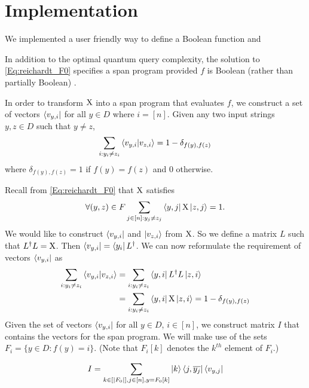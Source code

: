 \section{Implementation}

We implemented a user friendly way to define a Boolean function and 


In addition to the optimal quantum query complexity,
the solution to \cref{Eq:reichardt_F0} specifies
a span program provided $f$ is Boolean (rather than
partially Boolean) \cite{reichardt2009span}.

In order to transform $\operatorname{X}$ into a span program that
evaluates $f$, we construct a set of vectors
$\bra{v_{y,i}}$ for all $y \in D$ where $i = [n]$.
Given any two input strings $y, z \in D$ such that $y\neq z$,
\begin{align}
    \sum_{i: y_i \ne z_i} \braket{v_{y,i}|v_{z,i}} = 1 - \delta_{f(y), f(z)}
    \nonumber
\end{align}
where $\delta_{f(y), f(z)} = 1$ if $f(y) = f(z)$ and $0$ otherwise.

Recall from \cref{Eq:reichardt_F0} that $\operatorname{X}$ satisfies
\begin{align}
    \forall (y,z) \in F \sum_{j \in [n]: y_j \ne z_j} 
    \bra{y,j} \operatorname{X} \ket{z, j} = 1 \nonumber.
\end{align}
We would like to construct $\bra{v_{y,i}}$ and $\ket{v_{z,i}}$
from $\operatorname{X}$.
So we define a matrix $L$ such that $L^\dagger L = \operatorname{X}$.
Then $\bra{v_{y,i}} = \bra{y_i}L^\dagger$.
We can now reformulate the requirement of vectors $\bra{v_{y,i}}$
as
\begin{align}
    \sum_{i: y_i \ne z_i} \braket{v_{y,i}|v_{z,i}} &= \sum_{i: y_i \ne z_i}
    \bra{y,i} L^\dagger L \ket{z, i} \nonumber \\
    &= \sum_{i: y_i \ne z_i} \bra{y,i} \operatorname{X} \ket{z, i} = 
    1 - \delta_{f(y), f(z)}
    \nonumber
\end{align}
Given the set of vectors $\bra{v_{y,i}}$ for all $y \in
D$, $i \in [n]$, we construct 
matrix $I$ that contains the vectors for the span
program. We will make use of the sets $F_i =
\{y \in D: f(y) = i\}$.
(Note that $F_i[k]$ denotes the $k^{th}$ element of $F_i$.)

\begin{align}\label{input_vectors}
    I = \sum_{k \in [|F_0|], j \in [n], y = F_0[k]}
    \ket{k}\bra{j, \overline{y_j}} \bra{v_{y,j}}
    \nonumber
\end{align}

